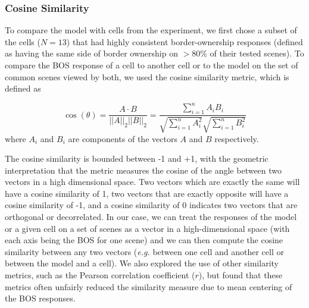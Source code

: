\documentclass[12pt]{article}
\newcommand{\eg}[0]{{\em e.g.}\xspace}
\begin{document}
\subsubsection{Cosine Similarity}
To compare the model with cells from the experiment, we first chose a subset of the cells ($N=13$) that had highly consistent border-ownership responses (defined as having the same side of border ownership on $>$80\% of their tested scenes). To compare the BOS response of a cell to another cell or to the model on the set of common scenes viewed by both, we used the cosine similarity metric, which is defined as

\begin{equation}
\cos(\theta) = \frac{A \cdot B}{||A||_{2}||B||_{2}} = \frac{\sum\limits_{i=1}^{n}A_{i}B_{i}}{\sqrt{\sum\limits_{i=1}^{n}A_{i}^2}\sqrt{\sum\limits_{i=1}^{n}B_{i}^2}}
\label{eq:cos_sim}
\end{equation}
where $A_i$ and $B_i$ are components of the vectors $A$ and $B$ respectively.

The cosine similarity is bounded between -1 and +1, with the geometric interpretation that the metric measures the cosine of the angle between two vectors in a high dimensional space. Two vectors which are exactly the same will have a cosine similarity of 1, two vectors that are exactly opposite will have a cosine similarity of -1, and a cosine similarity of 0 indicates two vectors that are orthogonal or decorrelated. In our case, we can treat the responses of the model or a given cell on a set of scenes as a vector in a high-dimensional space (with each axis being the BOS for one scene) and we can then compute the cosine similarity between any two vectors (\eg between one cell and another cell or between the model and a cell). We also explored the use of other similarity metrics, such as the Pearson correlation coefficient ($r$), but found that these metrics often unfairly reduced the similarity measure due to mean centering of the BOS responses.
\end{document}
